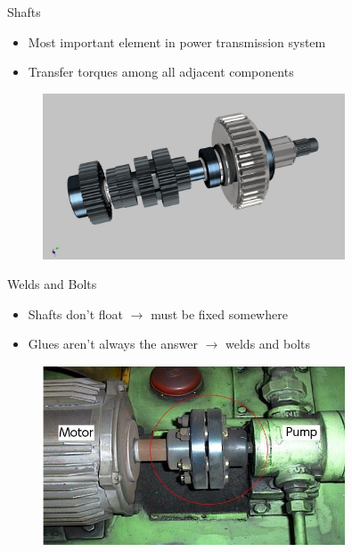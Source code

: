 \documentclass[
svgnames,
handout,
10pt,
]{beamer}
\begin{document}
\begin{frame}{Shafts}
  \begin{itemize}
    \item Most important element in power transmission system
    \item Transfer torques among all adjacent components
  \end{itemize}
  \begin{figure}[htbp]
    \centering
    \includegraphics[width=0.8\textwidth]{shaft}
  \end{figure}
\end{frame}

\begin{frame}{Welds and Bolts}
  \begin{itemize}
    \item Shafts don't float $\rightarrow$ must be fixed somewhere
    \item Glues aren't always the answer $\rightarrow$ welds and bolts
  \end{itemize}
  \begin{figure}[htbp]
    \centering
    \includegraphics[width=0.8\textwidth]{shaft-bolts}
  \end{figure}
\end{frame}
\end{document}
